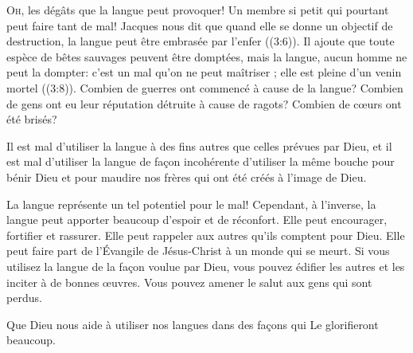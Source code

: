 




\lettrine{O}{h,} les dégâts que la langue peut provoquer!
 Un membre si petit qui pourtant peut faire tant de mal!
 Jacques nous dit que quand elle se donne un objectif de destruction,
 la langue peut être \Og embrasée par l'enfer \Fg{} ((3:6)).
 Il ajoute que toute espèce de bêtes sauvages peuvent être domptées,
 \Og mais la langue, aucun homme ne peut la dompter: c'est un mal
 qu'on ne peut maîtriser ; elle est pleine d'un venin mortel \Fg{}
 ((3:8)).
 Combien de guerres ont commencé à cause de la langue?
 Combien de gens ont eu leur réputation détruite à cause de ragots?
 Combien de c\oe{}urs ont été brisés? 


Il est mal d'utiliser la langue à des fins autres
 que celles prévues par Dieu, et il est mal d'utiliser la langue
 de fa\c{c}on incohérente \ocadr d'utiliser la même bouche pour bénir Dieu
 et pour maudire nos frères qui ont été créés à l'image de Dieu. 

La langue représente un tel potentiel pour le mal!
 Cependant, à l'inverse, la langue peut apporter beaucoup d'espoir
 et de réconfort. Elle peut encourager, fortifier et rassurer.
 Elle peut rappeler aux autres qu'ils comptent pour Dieu.
 Elle peut faire part de l'Évangile 
 de Jésus-Christ à un monde qui se meurt.
 Si vous utilisez la langue de la fa\c{c}on voulue par Dieu,
 vous pouvez édifier les autres et les inciter à de bonnes \oe{}uvres.
 Vous pouvez amener le salut aux gens qui sont perdus. 

Que Dieu nous aide à utiliser nos langues dans des fa\c{c}ons 
 qui Le glorifieront beaucoup. 

\dvrule



